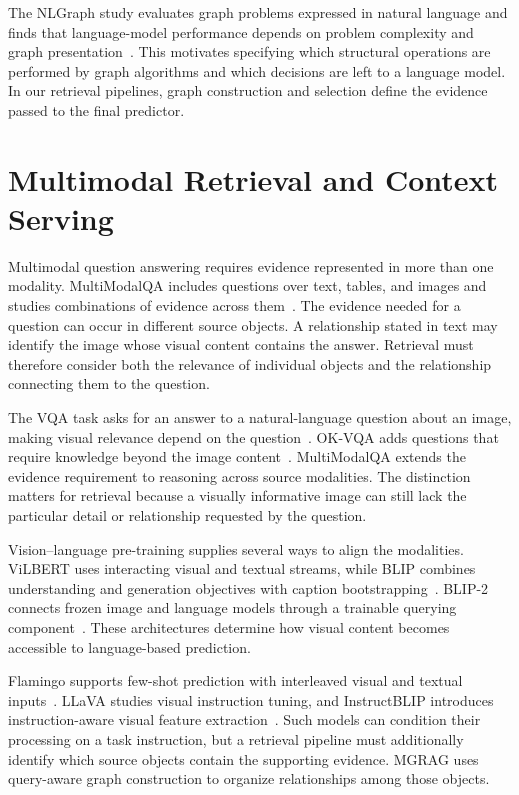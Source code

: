 The NLGraph study evaluates graph problems expressed in natural language and finds that language-model performance depends on problem complexity and graph presentation~\cite{lit-wang2023can}. This motivates specifying which structural operations are performed by graph algorithms and which decisions are left to a language model. In our retrieval pipelines, graph construction and selection define the evidence passed to the final predictor.

\section{Multimodal Retrieval and Context Serving}
\label{sec:background:multimodal}

Multimodal question answering requires evidence represented in more than one modality. MultiModalQA includes questions over text, tables, and images and studies combinations of evidence across them~\cite{bg-mmqa}. The evidence needed for a question can occur in different source objects. A relationship stated in text may identify the image whose visual content contains the answer. Retrieval must therefore consider both the relevance of individual objects and the relationship connecting them to the question.

The VQA task asks for an answer to a natural-language question about an image, making visual relevance depend on the question~\cite{lit-antol2015vqa}. OK-VQA adds questions that require knowledge beyond the image content~\cite{lit-marino2019okvqa}. MultiModalQA extends the evidence requirement to reasoning across source modalities. The distinction matters for retrieval because a visually informative image can still lack the particular detail or relationship requested by the question.

Vision--language pre-training supplies several ways to align the modalities. ViLBERT uses interacting visual and textual streams, while BLIP combines understanding and generation objectives with caption bootstrapping~\cite{lit-lu2019vilbert,lit-li2022blip}. BLIP-2 connects frozen image and language models through a trainable querying component~\cite{lit-li2023blip2}. These architectures determine how visual content becomes accessible to language-based prediction.

Flamingo supports few-shot prediction with interleaved visual and textual inputs~\cite{lit-alayrac2022flamingo}. LLaVA studies visual instruction tuning, and InstructBLIP introduces instruction-aware visual feature extraction~\cite{lit-liu2023llava,lit-dai2023instructblip}. Such models can condition their processing on a task instruction, but a retrieval pipeline must additionally identify which source objects contain the supporting evidence. MGRAG uses query-aware graph construction to organize relationships among those objects.

